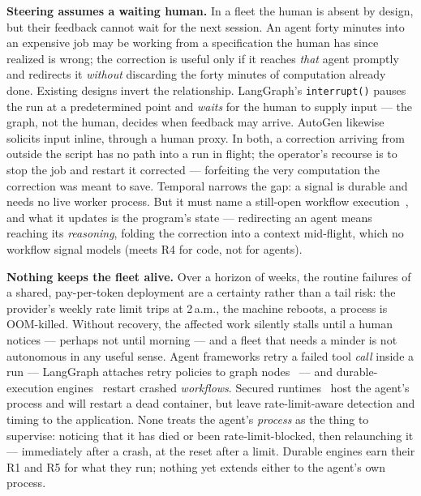 \documentclass[10pt,twocolumn]{article}
\newcommand{\code}[1]{\texttt{\small #1}}
\begin{document}
\noindent\textbf{Steering assumes a waiting human.} In a fleet the human is absent by
design, but their feedback cannot wait for the next session. An agent forty minutes
into an expensive job may be working from a specification the human has since realized
is wrong; the correction is useful only if it reaches \emph{that} agent promptly and
redirects it \emph{without} discarding the forty minutes of computation already done.
Existing designs invert the relationship. LangGraph's \code{interrupt()} pauses the
run at a predetermined point and \emph{waits} for the human to supply input --- the
graph, not the human, decides when feedback may arrive. AutoGen likewise solicits
input inline, through a human proxy. In both, a correction arriving from outside the
script has no path into a run in flight; the operator's recourse is to stop the job
and restart it corrected --- forfeiting the very computation the correction was meant
to save. Temporal narrows the gap: a signal is durable and needs no live worker
process. But it must name a still-open workflow
execution~\cite{temporal}, and what it updates is the program's state --- redirecting
an agent means reaching its \emph{reasoning}, folding the correction into a context
mid-flight, which no workflow signal models (meets R4 for code, not for agents).

\noindent\textbf{Nothing keeps the fleet alive.} Over a horizon of weeks, the routine
failures of a shared, pay-per-token deployment are a certainty rather than a tail
risk: the
provider's weekly rate limit trips at 2\,a.m., the machine reboots, a process is
OOM-killed. Without recovery, the affected work silently stalls until a human notices
--- perhaps not until morning --- and a fleet that needs a minder is not autonomous
in any useful sense. Agent frameworks retry a failed tool \emph{call} inside a run
--- LangGraph attaches retry policies to graph nodes~\cite{langgraph} --- and
durable-execution engines~\cite{temporal,stepfns} restart crashed \emph{workflows}.
Secured runtimes~\cite{nemoclaw,openhands} host the agent's process and will restart
a dead container, but leave rate-limit-aware detection and timing to the application.
None treats the agent's \emph{process} as the thing to supervise: noticing that it
has died or been rate-limit-blocked, then relaunching it --- immediately after a
crash, at the reset after a limit. Durable engines earn their R1 and R5 for what they
run; nothing yet extends either to the agent's own process.
\end{document}
